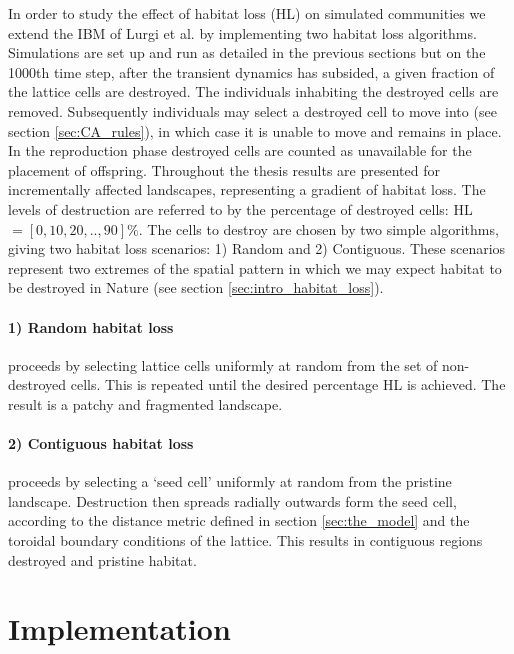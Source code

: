 In order to study the effect of habitat loss (HL) on simulated communities we extend the IBM of Lurgi et al. \cite{lurgi2015effects} by implementing two habitat loss algorithms. Simulations are set up and run as detailed in the previous sections but on the 1000th time step, after the transient dynamics has subsided, a given fraction of the lattice cells are destroyed. The individuals inhabiting the destroyed cells are removed. Subsequently individuals may select a destroyed cell to move into (see section \ref{sec:CA_rules}), in which case it is unable to move and remains in place. In the reproduction phase destroyed cells are counted as unavailable for the placement of offspring. Throughout the thesis results are presented for incrementally affected landscapes, representing a gradient of habitat loss. The levels of destruction are referred to by the percentage of destroyed cells: HL $=[0,10,20,..,90] \%$. The cells to destroy are chosen by two simple algorithms, giving two habitat loss scenarios: 1) Random and 2) Contiguous. These scenarios represent two extremes of the spatial pattern in which we may expect habitat to be destroyed in Nature (see section \ref{sec:intro_habitat_loss}).

\paragraph*{1) Random habitat loss} proceeds by selecting lattice cells uniformly at random from the set of non-destroyed cells. This is repeated until the desired percentage HL is achieved. The result is a patchy and fragmented landscape.  

\paragraph*{2) Contiguous habitat loss} proceeds by selecting a `seed cell' uniformly at random from the pristine landscape. Destruction then spreads radially outwards form the seed cell, according to the distance metric defined in section \ref{sec:the_model} and the toroidal boundary conditions of the lattice. This results in contiguous regions destroyed and pristine habitat.
 

\section{Implementation}
\label{sec:implementation}


